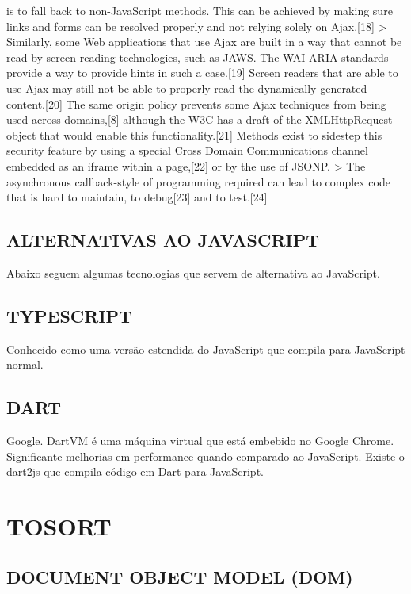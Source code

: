 \documentclass[11pt,a4paper]{article}
\begin{document}
is to fall back to non-JavaScript methods. This can be achieved by
making sure links and forms can be resolved properly and not relying
solely on Ajax.[18] > Similarly, some Web applications that use Ajax
are built in a way that cannot be read by screen-reading technologies,
such as JAWS. The WAI-ARIA standards provide a way to provide hints in
such a case.[19] Screen readers that are able to use Ajax may still not
be able to properly read the dynamically generated content.[20] The
same origin policy prevents some Ajax techniques from being used across
domains,[8] although the W3C has a draft of the XMLHttpRequest object
that would enable this functionality.[21] Methods exist to sidestep this
security feature by using a special Cross Domain Communications channel
embedded as an iframe within a page,[22] or by the use of JSONP. > The
asynchronous callback-style of programming required can lead to complex
code that is hard to maintain, to debug[23] and to test.[24]

\subsection{ ALTERNATIVAS AO JAVASCRIPT}

Abaixo seguem algumas tecnologias que servem de alternativa ao
JavaScript.

\subsection{ TYPESCRIPT}

Conhecido como uma versão estendida do JavaScript que compila para
JavaScript normal.

\subsection{ DART}

Google. DartVM é uma máquina virtual que está embebido no Google
Chrome. Significante melhorias em performance quando comparado
ao JavaScript. Existe o dart2js que compila código em Dart para
JavaScript.

\section{TOSORT}

\subsection{ DOCUMENT OBJECT MODEL (DOM)}
\end{document}

